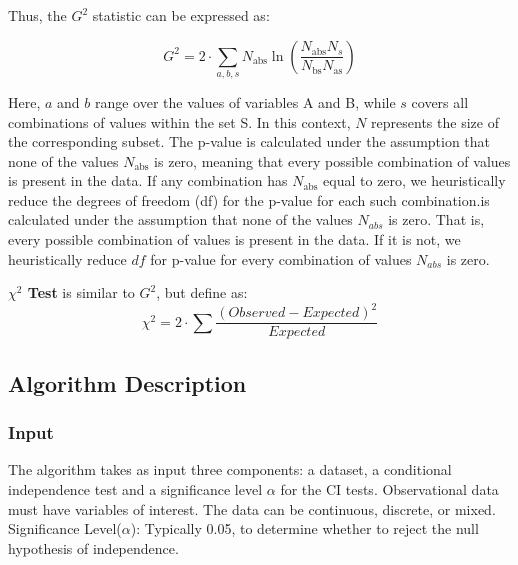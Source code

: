 \documentclass[main.tex]{subfiles}
\begin{document}
Thus, the $ G^2 $ statistic can be expressed as:

\[
G^2 = 2 \cdot \sum_{a,b,s} N_{\text{abs}} \ln \left( \frac{N_{\text{abs}} N_s}{N_{\text{bs}} N_{\text{as}}} \right)
\]

Here, $ a $ and $ b $ range over the values of variables A and B, while $ s $ covers all combinations of values within the set S. In this context, $ N $ represents the size of the corresponding subset. The p-value is calculated under the assumption that none of the values $ N_{\text{abs}} $ is zero, meaning that every possible combination of values is present in the data. If any combination has $ N_{\text{abs}} $ equal to zero, we heuristically reduce the degrees of freedom (df) for the p-value for each such combination.is calculated under the assumption that none of the values $N_{abs}$ is zero. That 
is, every possible combination of values is present in the data. If it is not, we heuristically reduce $df$ for p-value for every combination of values $N_{abs}$ is zero.

\textbf{$ \chi^2 $ Test} is similar to $G^2$, but define as:
\[\chi ^2 = 2 \cdot \sum \frac{(Observed - Expected)^2}{Expected}\]


\subsection{Algorithm Description}
\subsubsection{Input}
The algorithm takes as input three components: a dataset, a conditional independence test and a significance level $\alpha$ for the CI tests. Observational data must have variables of interest. The data can be continuous, discrete, or mixed.
Significance Level($\alpha$): Typically 0.05, to determine whether to reject the null hypothesis of independence.
\end{document}
